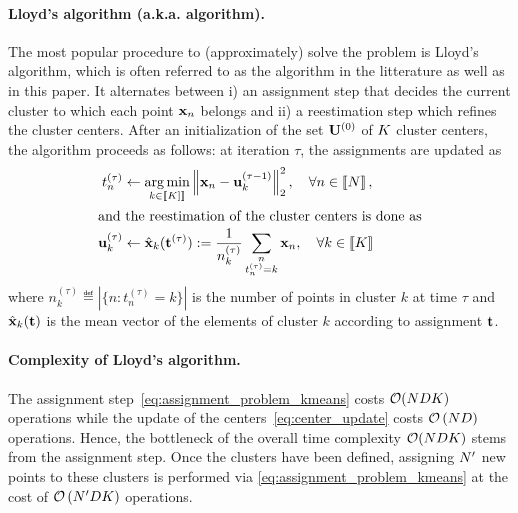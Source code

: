 \paragraph{Lloyd's algorithm (a.k.a. \kmeans algorithm).} The most popular procedure to (approximately) 
solve the \kmeans problem is Lloyd's algorithm, which is often referred to as the \kmeans algorithm in the litterature as well as in this paper.
It alternates between
i) an assignment step that decides the current cluster to which each point ${\mathbf{x}}_n$
belongs and ii) a reestimation step which refines the cluster centers.
After an initialization of the set ${\mathbf{U}}^{(0)}$ of $K$
 cluster centers, the algorithm proceeds as follows: at iteration $\tau$,
  the assignments are updated as
\begin{align}
\label{eq:assignment_problem_kmeans}
 t_n^{(\tau)} &\leftarrow \operatorname*{arg\,min}_{k \in \left \llbracket K]\right \rrbracket} \left\|{\mathbf{x}}_{n} - {\mathbf{u}}_{k}^{(\tau-1)}\right\|_2^2,\quad \forall n\in\left \llbracket N\right \rrbracket,\\
\intertext{and the reestimation of the cluster centers is done as}
\label{eq:center_update}
{\mathbf{u}}^{(\tau)}_k &\leftarrow \hat{{\mathbf{x}}}_k({\mathbf{t}}^{(\tau)}) := \frac{1}{n_k^{(\tau)}} \sum_{\substack{n\\t^{(\tau)}_n= k}} {{\mathbf{x}}_{n}},\quad \forall k\in\left \llbracket K\right \rrbracket 
\end{align}
where $n_k^{(\tau)}\eqdef |\{n: t^{(\tau)}_n=k\}|$ is the number of points in cluster $k$
at time $\tau$ and $\hat{{\mathbf{x}}}_k({\mathbf{t}})$ is the mean vector of the elements of cluster $k$ according to assignment ${\mathbf{t}}$. 

\paragraph{Complexity of Lloyd's algorithm.} The assignment step~\eqref{eq:assignment_problem_kmeans} costs $\mathcal{O}(NDK)$ operations while the update of the centers~\eqref{eq:center_update} costs $\mathcal{O}\left (ND\right )$ operations. Hence, the bottleneck of the overall time complexity $\mathcal{O}(NDK)$ stems from the assignment step. Once the clusters have been defined, assigning $N'$ new points to these clusters is performed via \eqref{eq:assignment_problem_kmeans} at the cost of $\mathcal{O}\left (N'DK \right )$ operations.

